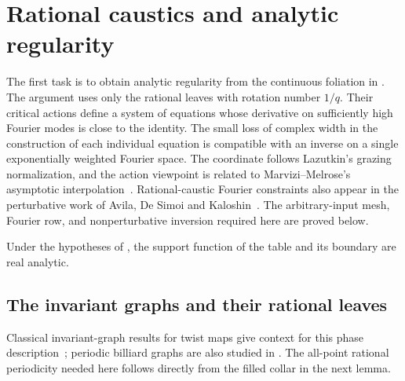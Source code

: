 \section{Rational caustics and analytic regularity}\label{ana:section}

The first task is to obtain analytic regularity from the continuous
foliation in .  The argument uses only the rational
leaves with rotation number \(1/q\).  Their critical actions define a system
of equations whose derivative on sufficiently high Fourier modes is close
to the identity.  The small loss of complex width in the construction of
each individual equation is compatible with an inverse on a single
exponentially weighted Fourier space.
The coordinate follows Lazutkin's grazing normalization, and the
action viewpoint is related to Marvizi--Melrose's asymptotic
interpolation~\cite{Lazutkin1973,MM1982}. Rational-caustic Fourier
constraints also appear in the perturbative work of Avila, De Simoi
and Kaloshin~\cite{ADK2016}. The arbitrary-input mesh, Fourier row,
and nonperturbative inversion required here are proved below.

\begin{theorem}\label{thm:analytic}
Under the hypotheses of , the support function of the table
and its boundary are real analytic.
\end{theorem}

\subsection{The invariant graphs and their rational leaves}

Classical invariant-graph results for twist maps give context for this
phase description~\cite{Arnaud2009}; periodic billiard graphs are also
studied in \cite[Appendix~A]{FS2026}. The all-point rational periodicity
needed here follows directly from the filled collar in the next lemma.

